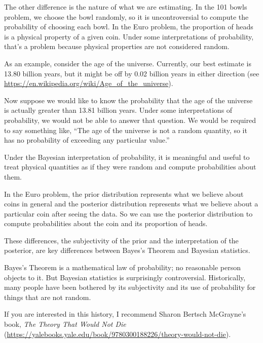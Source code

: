 \documentclass[12pt]{book}
\theoremstyle{exercise}
\begin{document}
The other difference is the nature of what we are estimating.
In the 101 bowls problem, we choose the bowl randomly, so it is uncontroversial to compute the probability of choosing each bowl.
In the Euro problem, the proportion of heads is a physical property of a given coin.
Under some interpretations of probability, that's a problem because physical properties are not considered random.

As an example, consider the age of the universe.
Currently, our best estimate is 13.80 billion years, but it might be off by 0.02 billion years in either direction (see \url{https://en.wikipedia.org/wiki/Age_of_the_universe}).

Now suppose we would like to know the probability that the age of the universe is actually greater than 13.81 billion years.
Under some interpretations of probability, we would not be able to answer that question.
We would be required to say something like, ``The age of the universe is not a random quantity, so it has no probability of exceeding any particular value.''

Under the Bayesian interpretation of probability, it is meaningful and useful to treat physical quantities as if they were random and compute probabilities about them.

In the Euro problem, the prior distribution represents what we believe about coins in general and the posterior distribution represents what we believe about a particular coin after seeing the data.
So we can use the posterior distribution to compute probabilities about the coin and its proportion of heads.

These differences, the subjectivity of the prior and the interpretation of the posterior, are key differences between Bayes's Theorem and Bayesian statistics.

Bayes's Theorem is a mathematical law of probability; no reasonable person objects to it.
But Bayesian statistics is surprisingly controversial.
Historically, many people have been bothered by its subjectivity and its use of probability for things that are not random.

If you are interested in this history, I recommend Sharon Bertsch McGrayne's book, {\it The Theory That Would Not Die} (\url{https://yalebooks.yale.edu/book/9780300188226/theory-would-not-die}).


\end{document}
